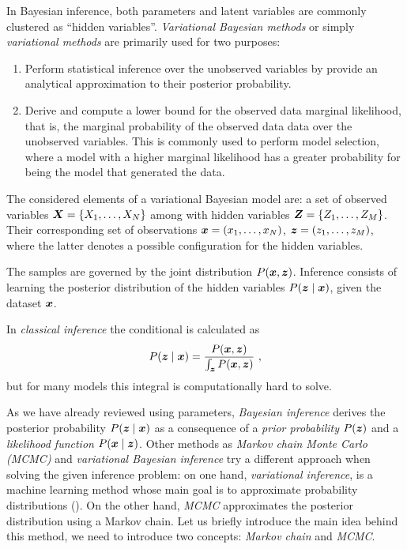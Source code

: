 
In Bayesian inference, both parameters and latent variables are commonly clustered as ``hidden variables''. \emph{Variational Bayesian methods} or simply \emph{variational methods} are primarily used for two purposes:

 \begin{enumerate}  \setlength{\itemsep}{1pt}
   \item Perform statistical inference over the unobserved variables by provide an analytical approximation to their posterior probability.
   \item Derive and compute a lower bound for the observed data marginal likelihood, that is, the marginal probability of the observed data data over the unobserved variables. This is commonly used to perform model selection, where a model with a higher marginal likelihood has a greater probability for being the model that generated the data.
 \end{enumerate}

 The considered elements of a variational Bayesian model are: a set of observed variables \(\bm{X} = \{X_{1},\dots,X_{N}\}\) among with hidden variables \(\bm{Z} = \{Z_{1},\dots,Z_{M}\}\). Their corresponding set of observations \(\bm{x} = (x_{1},\dots, x_{N})\),  \(\bm{z} = (z_{1}, \dots, z_{M})\), where the latter denotes a possible configuration for the hidden variables.

The samples are governed by the joint distribution \(P(\bm{x}, \bm{z})\). Inference consists of learning the posterior distribution of the hidden variables \(P(\bm{z} \mid \bm{x})\), given the dataset \(\bm{x}\).

In \emph{classical inference} the conditional is calculated as
\[
  P(\bm{z} \mid \bm{x}) = \frac{P(\bm{x}, \bm{z})}{\int_{\bm{z}} P(\bm{x},\bm{z})}\ ,
\]
but for many models this integral is computationally hard to solve.

As we have already reviewed using parameters, \emph{Bayesian inference} derives the posterior probability \(P(\bm{z} \mid \bm{x})\) as a consequence of a \emph{prior probability} \(P(\bm{z})\) and a \emph{likelihood function} \(P(\bm{x} \mid \bm{z})\). Other methods as \emph{Markov chain Monte Carlo (MCMC)} and \emph{variational Bayesian inference} try a different approach when solving the given inference problem: on one hand, \emph{variational inference}, is a machine learning method whose main goal is to approximate probability distributions (\cite{jordan1999introduction, wainwright}). On the other hand, \emph{MCMC} approximates the posterior distribution using a Markov chain. Let us briefly introduce the main idea behind this method, we need to introduce two concepts: \emph{Markov chain} and \emph{MCMC}.

